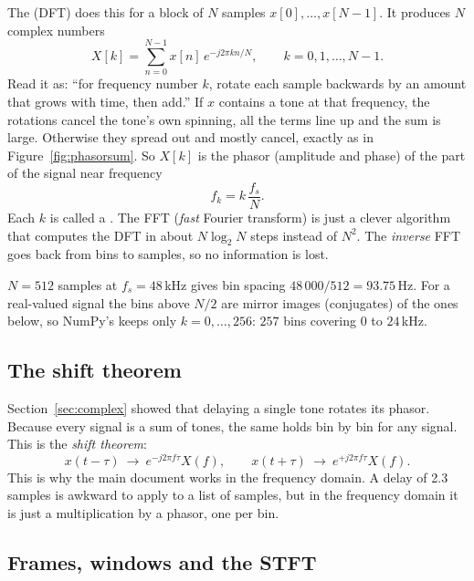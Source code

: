 \documentclass[11pt]{article}
\begin{document}
The  (DFT) does this for a block of $N$ samples
$x[0],\dots,x[N-1]$. It produces $N$ complex numbers
\begin{equation}\label{eq:dft}
  X[k]=\sum_{n=0}^{N-1}x[n]\,e^{-j2\pi kn/N},\qquad k=0,1,\dots,N-1.
\end{equation}
Read it as: ``for frequency number $k$, rotate each sample backwards by an amount that grows with
time, then add.'' If $x$ contains a tone at that frequency, the rotations cancel the tone's own
spinning, all the terms line up and the sum is large. Otherwise they spread out and mostly cancel,
exactly as in Figure~\ref{fig:phasorsum}. So $X[k]$ is the phasor (amplitude and phase) of the part
of the signal near frequency
\[
  f_k=k\,\frac{f_s}{N}.
\]
Each $k$ is called a . The FFT (\emph{fast} Fourier transform) is just a
clever algorithm that computes the DFT in about $N\log_2N$ steps instead of $N^2$. The
\emph{inverse} FFT goes back from bins to samples, so no information is lost.

\begin{example}
$N=512$ samples at $f_s=48$\,kHz gives bin spacing $48\,000/512=93.75$\,Hz. For a real-valued
signal the bins above $N/2$ are mirror images (conjugates) of the ones below, so NumPy's
 keeps only $k=0,\dots,256$: $257$ bins covering $0$ to $24$\,kHz.
\end{example}

\subsection{The shift theorem}

Section~\ref{sec:complex} showed that delaying a single tone rotates its phasor. Because every
signal is a sum of tones, the same holds bin by bin for any signal. This is the \emph{shift
theorem}:
\begin{equation}\label{eq:shift}
  x(t-\tau)\ \longrightarrow\ e^{-j2\pi f\tau}X(f),\qquad
  x(t+\tau)\ \longrightarrow\ e^{+j2\pi f\tau}X(f).
\end{equation}
This is why the main document works in the frequency domain. A delay of 2.3 samples is awkward to
apply to a list of samples, but in the frequency domain it is just a multiplication by a phasor,
one per bin.

\subsection{Frames, windows and the STFT}
\end{document}
